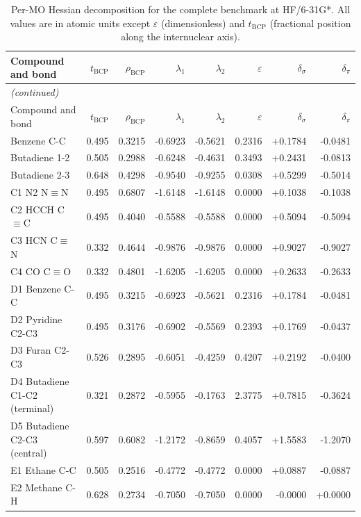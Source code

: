 \documentclass[11pt,a4paper]{article}
\begin{document}
\begin{longtable}{p{4.5cm}rrrrrrr}
\caption{Per-MO Hessian decomposition for the complete benchmark at
HF/6-31G*. All values are in atomic units except $\varepsilon$ (dimensionless)
and $t_{\text{BCP}}$ (fractional position along the internuclear axis).}
\label{tab:SI_full}\\
\toprule
Compound and bond & $t_{\text{BCP}}$ & $\rho_{\text{BCP}}$ & $\lambda_1$ &
$\lambda_2$ & $\varepsilon$ & $\delta_\sigma$ & $\delta_\pi$ \\
\midrule
\endfirsthead
\multicolumn{8}{l}{\textit{(continued)}}\\
\toprule
Compound and bond & $t_{\text{BCP}}$ & $\rho_{\text{BCP}}$ & $\lambda_1$ &
$\lambda_2$ & $\varepsilon$ & $\delta_\sigma$ & $\delta_\pi$ \\
\midrule
\endhead
\bottomrule
\endfoot
Benzene C-C & 0.495 & 0.3215 & -0.6923 & -0.5621 & 0.2316 & +0.1784 & -0.0481\\
Butadiene 1-2 & 0.505 & 0.2988 & -0.6248 & -0.4631 & 0.3493 & +0.2431 & -0.0813\\
Butadiene 2-3 & 0.648 & 0.4298 & -0.9540 & -0.9255 & 0.0308 & +0.5299 & -0.5014\\
C1 N2 N$\equiv$N & 0.495 & 0.6807 & -1.6148 & -1.6148 & 0.0000 & +0.1038 & -0.1038\\
C2 HCCH C$\equiv$C & 0.495 & 0.4040 & -0.5588 & -0.5588 & 0.0000 & +0.5094 & -0.5094\\
C3 HCN C$\equiv$N & 0.332 & 0.4644 & -0.9876 & -0.9876 & 0.0000 & +0.9027 & -0.9027\\
C4 CO C$\equiv$O & 0.332 & 0.4801 & -1.6205 & -1.6205 & 0.0000 & +0.2633 & -0.2633\\
D1 Benzene C-C & 0.495 & 0.3215 & -0.6923 & -0.5621 & 0.2316 & +0.1784 & -0.0481\\
D2 Pyridine C2-C3 & 0.495 & 0.3176 & -0.6902 & -0.5569 & 0.2393 & +0.1769 & -0.0437\\
D3 Furan C2-C3 & 0.526 & 0.2895 & -0.6051 & -0.4259 & 0.4207 & +0.2192 & -0.0400\\
D4 Butadiene C1-C2 (terminal) & 0.321 & 0.2872 & -0.5955 & -0.1763 & 2.3775 & +0.7815 & -0.3624\\
D5 Butadiene C2-C3 (central) & 0.597 & 0.6082 & -1.2172 & -0.8659 & 0.4057 & +1.5583 & -1.2070\\
E1 Ethane C-C & 0.505 & 0.2516 & -0.4772 & -0.4772 & 0.0000 & +0.0887 & -0.0887\\
E2 Methane C-H & 0.628 & 0.2734 & -0.7050 & -0.7050 & 0.0000 & -0.0000 & +0.0000\\

\end{longtable}
\end{document}
